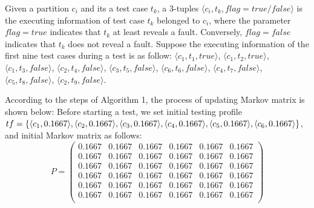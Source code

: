 \documentclass[10pt,journal,compsoc]{IEEEtran}
\begin{document}
Given a partition $c_i$ and its a test case $t_k$, a 3-tuples $\langle c_i,t_k,flag = true/false \rangle$ is the executing information of test case $t_k$ belonged to $c_i$, where the parameter $flag = true$ indicates that $t_k$ at least reveals a fault. Conversely, $flag = false$ indicates that $t_k$ does not reveal a fault. Suppose the executing information of the first nine test cases during a test is as follow: $\langle c_1,t_1,true \rangle$, $\langle c_1,t_2,true \rangle$, $\langle c_1,t_3,false\rangle$, $\langle c_2,t_4,false \rangle$, $\langle c_3,t_5,false \rangle$, $\langle c_6,t_6,false \rangle$, $\langle c_4,t_7,false \rangle$, $\langle c_5,t_8,false \rangle$, $\langle c_2,t_9,false \rangle$.

According to the steps of Algorithm 1, the process of updating Markov matrix is shown below: Before starting a test, we set initial testing profile $tf = \{\langle c_1,0.1667 \rangle, \langle c_2, 0.1667\rangle, \langle c_3, 0.1667 \rangle, \langle c_4, 0.1667 \rangle, \langle c_5, 0.16\\67 \rangle, \langle c_6, 0.1667 \rangle\}$, and initial Markov matrix as follows:
\begin{equation}
\label{eq:Inimatrix}
P =
\begin{pmatrix}
	0.1667 & 0.1667  & 0.1667  & 0.1667  & 0.1667  & 0.1667 \\
	0.1667 & 0.1667  & 0.1667  & 0.1667  & 0.1667  & 0.1667  \\
	0.1667 & 0.1667  & 0.1667  & 0.1667  & 0.1667  & 0.1667  \\
    0.1667 & 0.1667  & 0.1667  & 0.1667  & 0.1667  & 0.1667  \\
    0.1667 & 0.1667  & 0.1667  & 0.1667  & 0.1667  & 0.1667  \\
    0.1667 & 0.1667  & 0.1667  & 0.1667  & 0.1667  & 0.1667  \\
\end{pmatrix}
\end{equation}
\end{document}
